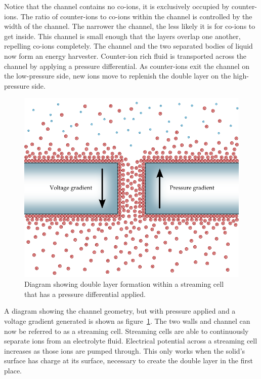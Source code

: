   Notice that the channel contains no co-ions, it is exclusively occupied by counter-ions.
  The ratio of counter-ions to co-ions within the channel is controlled by the width of the channel.
  The narrower the channel, the less likely it is for co-ions to get inside.
  This channel is small enough that the layers overlap one another, repelling co-ions completely.
  The channel and the two separated bodies of liquid now form an energy harvester.
  Counter-ion rich fluid is transported across the channel by applying a pressure differential.
  As counter-ions exit the channel on the low-pressure side, new ions move to replenish the double layer on the high-pressure side.
  \begin{figure}
      \centering
      \includegraphics{content/pt1/01-PowerHarvesting/graphics/intro_2_channel}
      \caption{\label{fig:doubleLayerInChannel_withPressure}Diagram showing double layer formation within a streaming cell that has a pressure differential applied.}
  \end{figure}
  A diagram showing the channel geometry, but with pressure applied and a voltage gradient generated is shown as figure~\ref{fig:doubleLayerInChannel_withPressure}.
  The two walls and channel can now be referred to as a streaming cell.
  Streaming cells are able to continuously separate ions from an electrolyte fluid.
  Electrical potential across a streaming cell increases as those ions are pumped through.
  This only works when the solid's surface has charge at its surface, necessary to create the double layer in the first place.

